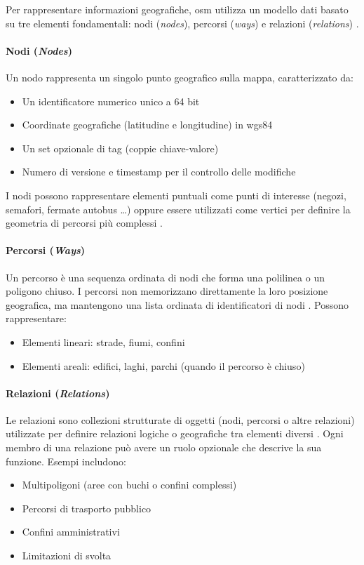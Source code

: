 Per rappresentare informazioni geografiche, \acrfull{osm} utilizza un modello dati basato su tre elementi fondamentali:
nodi (\textit{nodes}), percorsi (\textit{ways}) e relazioni (\textit{relations}) \cite{elements2024}.

\paragraph{Nodi (\textit{Nodes})}

Un nodo rappresenta un singolo punto geografico sulla mappa, caratterizzato da:
\begin{itemize}
  \item Un identificatore numerico unico a 64 bit
  \item Coordinate geografiche (latitudine e longitudine) in \acrshort{wgs84}
  \item Un set opzionale di tag (coppie chiave-valore)
  \item Numero di versione e timestamp per il controllo delle modifiche
\end{itemize}

I nodi possono rappresentare elementi puntuali come punti di interesse (negozi, semafori, fermate autobus \dots) oppure
essere utilizzati come vertici per definire la geometria di percorsi più complessi \cite{osmdata2024}.

\paragraph{Percorsi (\textit{Ways})}
Un percorso è una sequenza ordinata di nodi che forma una polilinea o un poligono chiuso.
I percorsi non memorizzano direttamente la loro posizione geografica, ma mantengono una lista ordinata di identificatori
di nodi \cite{osmdata2024}. Possono rappresentare:
\begin{itemize}
  \item Elementi lineari: strade, fiumi, confini
  \item Elementi areali: edifici, laghi, parchi (quando il percorso è chiuso)
\end{itemize}

\paragraph{Relazioni (\textit{Relations})}
Le relazioni sono collezioni strutturate di oggetti (nodi, percorsi o altre relazioni) utilizzate per definire relazioni
logiche o geografiche tra elementi diversi \cite{relations2024}. Ogni membro di una relazione può avere un ruolo
opzionale che descrive la sua funzione. Esempi includono:
\begin{itemize}
  \item Multipoligoni (aree con buchi o confini complessi)
  \item Percorsi di trasporto pubblico
  \item Confini amministrativi
  \item Limitazioni di svolta
\end{itemize}

